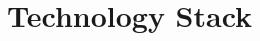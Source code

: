 \documentclass[12pt, a4paper]{article}
\begin{document}
\section{Technology Stack}




 
\end{document}
